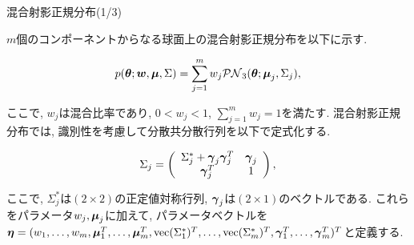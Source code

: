 \documentclass[dvipdfmx]{beamer} %
\newcommand{\bm}[1]{\mbox{\boldmath $#1$}}
\begin{document}
\begin{frame}{混合射影正規分布(1/3)}

$m$個のコンポーネントからなる球面上の混合射影正規分布を以下に示す. 

\vspace{-0.3cm}
\begin{eqnarray*}
\label{MPNS}
p(\bm \theta;\bm w,\bm \mu, \Sigma) = \sum^m_{j=1} w_j \mathcal{PN}_3(\bm \theta;\bm \mu_j, \Sigma_j),
\end{eqnarray*}

\noindent
ここで, $w_j$は混合比率であり, $0 < w_j < 1$, $\sum^m_{j=1} w_j = 1$を満たす. 混合射影正規分布では, 識別性を考慮して分散共分散行列を以下で定式化する. 

\vspace{-0.2cm}
\begin{eqnarray*}
\label{SIGMA}
 \Sigma_j = \left(
    \begin{array}{cc}
      \Sigma^*_j + \bm \gamma_j \bm \gamma_j^T & \bm \gamma_j \\
      \bm \gamma_j^T & 1
    \end{array}
  \right),
\end{eqnarray*}

\noindent
ここで, $\Sigma^*_j$は$(2 \times 2)$の正定値対称行列, $\bm \gamma_j$は$(2 \times 1)$のベクトルである. これらをパラメータ$w_j, \bm \mu_j$に加えて, パラメータベクトルを$\bm \eta = (w_1, \dots, w_m, \bm \mu_1^T, \dots, \bm \mu_m^T, \mbox{vec}(\Sigma^*_1)^T, \dots, \mbox{vec}(\Sigma^*_m)^T, \bm \gamma_1^T, \dots, \bm \gamma_m^T)^T$と定義する.

\end{frame}
\end{document}
